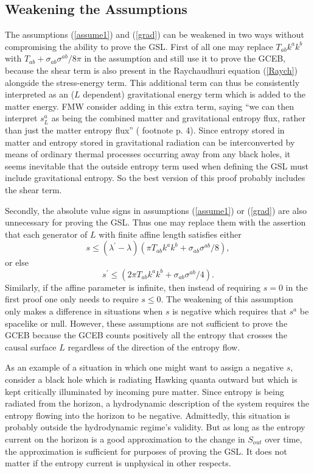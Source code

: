 \documentclass[12pt]{article}
\begin{document}
\subsection{Weakening the Assumptions}\label{weak}

The assumptions (\ref{assume1}) and (\ref{grad}) can be weakened in two ways without compromising the ability to prove the GSL.  First of all one may replace $T_{ab} k^a k^b$ with $T_{ab} + \sigma_{ab}\sigma^{ab}/8\pi$ in the assumption and still use it to prove the GCEB, because the shear term is also present in the Raychaudhuri equation (\ref{Raych}) alongside the stress-energy term.  This additional term can thus be consistently interpreted as an ($L$ dependent) gravitational energy term which is added to the matter energy.  FMW consider adding in this extra term, saying ``we can then interpret $s^{a}_{L}$ as being the combined matter and gravitational entropy flux, rather than just the matter entropy flux'' (\cite{FMW00} footnote p. 4).  Since entropy stored in matter and entropy stored in gravitational radiation can be interconverted by means of ordinary thermal processes occurring away from any black holes, it seems inevitable that the outside entropy term used when defining the GSL must include gravitational entropy.  So the best version of this proof probably includes the shear term.

Secondly, the absolute value signs in assumptions (\ref{assume1}) or (\ref{grad}) are also unnecessary for proving the GSL.  Thus one may replace them with the assertion that each generator of $L$ with finite affine length satisfies either
\begin{equation}\label{weak1}
s \le (\lambda^{\prime} - \lambda)(\pi T_{ab}k^{a}k^{b} + \sigma_{ab}\sigma^{ab}/8),
\end{equation}
or else
\begin{equation}\label{weak2}
s^{\prime} \le (2\pi T_{ab} k^a k^b + \sigma_{ab}\sigma^{ab}/4).
\end{equation}
Similarly, if the affine parameter is infinite, then instead of requiring $s = 0$ in the first proof one only needs to require $s \le 0$.  The weakening of this assumption only makes a difference in situations when $s$ is negative which requires that $s^a$ be spacelike or null.  However, these assumptions are not sufficient to prove the GCEB because the GCEB counts positively all the entropy that crosses the causal surface $L$ regardless of the direction of the entropy flow.

As an example of a situation in which one might want to assign a negative $s$, consider a black hole which is radiating Hawking quanta outward but which is kept critically illuminated by incoming pure matter.  Since entropy is being radiated from the horizon, a hydrodynamic description of the system requires the entropy flowing into the horizon to be negative.  Admittedly, this situation is probably outside the hydrodynamic regime's validity.  But as long as the entropy current on the horizon is a good approximation to the change in $S_{out}$ over time, the approximation is sufficient for purposes of proving the GSL.  It does not matter if the entropy current is unphysical in other respects.
\end{document}

